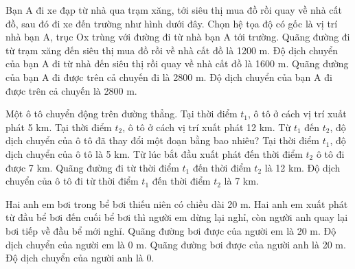 \begin{ex}
Bạn A đi xe đạp từ nhà qua trạm xăng, tới siêu thị mua đồ rồi quay về nhà cất đồ, sau đó đi xe đến trường như hình dưới đây. Chọn hệ tọa độ có gốc là vị trí nhà bạn A, trục Ox trùng với đường đi từ nhà bạn A tới trường.
\choiceTF
{\True Quãng đường đi từ trạm xăng đến siêu thị mua đồ rồi về nhà cất đồ là 1200 m.}
{Độ dịch chuyển của bạn A đi từ nhà đến siêu thị rồi quay về nhà cất đồ là 1600 m.}
{\True Quãng đường của bạn A đi được trên cả chuyến đi là 2800 m.}
{Độ dịch chuyển của bạn A đi được trên cả chuyến là 2800 m.}
\end{ex}

\begin{ex}
Một ô tô chuyển động trên đường thẳng. Tại thời điểm $t_1$, ô tô ở cách vị trí xuất phát 5 km. Tại thời điểm $t_2$, ô tô ở cách vị trí xuất phát 12 km. Từ $t_1$ đến $t_2$, độ dịch chuyển của ô tô đã thay đổi một đoạn bằng bao nhiêu?
\choiceTF
{\True Tại thời điểm $t_1$, độ dịch chuyển của ô tô là 5 km.}
{Từ lúc bắt đầu xuất phát đến thời điểm $t_2$ ô tô đi được 7 km.}
{Quãng đường đi từ thời điểm $t_1$ đến thời điểm $t_2$ là 12 km.}
{\True Độ dịch chuyển của ô tô đi từ thời điểm $t_1$ đến thời điểm $t_2$ là 7 km.}
\end{ex}

\begin{ex}
Hai anh em bơi trong bể bơi thiếu niên có chiều dài 20 m. Hai anh em xuất phát từ đầu bể bơi đến cuối bể bơi thì người em dừng lại nghỉ, còn người anh quay lại bơi tiếp về đầu bể mới nghỉ.
\choiceTF
{\True Quãng đường bơi được của người em là 20 m.}
{Độ dịch chuyển của người em là 0 m.}
{Quãng đường bơi được của người anh là 20 m.}
{\True Độ dịch chuyển của người anh là 0.}
\end{ex}

